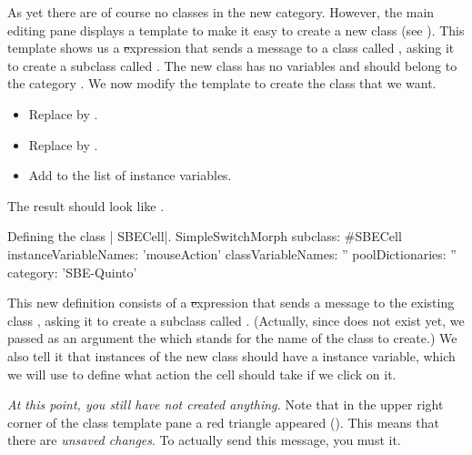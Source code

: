 \documentclass[a4paper,10pt,twoside]{book}
\begin{document}
As yet there are  of course no classes in the new category.
However, the main editing pane displays a template to make it easy to create a new class (see ).
This template shows us a \st expression that sends a message to a class called , asking it to create a subclass called .
The new class has no variables and should belong to the category .
We now modify the template to create the class that we want.

\begin{itemize}
  \item Replace  by .
  \item Replace  by .
  \item Add  to the list of instance variables.
\end{itemize}
The result should look like .

\begin{classdef}[firstClassDef]{Defining the class \ct| SBECell|.}
SimpleSwitchMorph subclass: #SBECell
   instanceVariableNames: 'mouseAction'
   classVariableNames: ''
   poolDictionaries: ''
   category: 'SBE-Quinto'
\end{classdef}

This new definition consists of a \st expression that sends a message to the existing class , asking it to create a subclass called .
(Actually, since  does not exist yet, we passed as an argument the   which stands for the name of the class to create.)
We also tell it that instances of the new class should have a  instance variable, which we will use to define what action the cell should take if we click on it.

\emph{At this point, you still have not created anything.}
Note that in the upper right corner of the class template pane a red triangle appeared ().
This means that there are \emph{unsaved changes}.
To actually send this message, you must  it.
\end{document}
